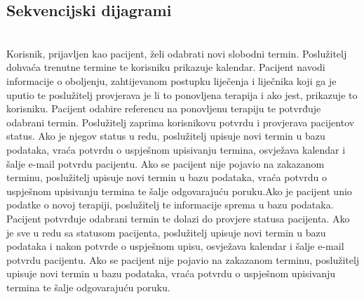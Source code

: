 \newpage
\subsection{Sekvencijski dijagrami}

\textbf{}\\

Korisnik, prijavljen kao pacijent, želi odabrati novi slobodni termin. Poslužitelj dohvaća trenutne termine te korisniku prikazuje kalendar. Pacijent navodi informacije o oboljenju, zahtijevanom postupku liječenja i liječnika koji ga je uputio te poslužitelj provjerava je li to ponovljena terapija i ako jest, prikazuje to korisniku. Pacijent odabire referencu na ponovljenu terapiju te potvrđuje odabrani termin. Poslužitelj zaprima korisnikovu potvrdu i provjerava pacijentov status. Ako je njegov status u redu, poslužitelj upisuje novi termin u bazu podataka, vraća potvrdu o uspješnom upisivanju termina, osvježava kalendar i šalje e-mail potvrdu pacijentu. Ako se pacijent nije pojavio na zakazanom terminu, poslužitelj upisuje novi termin u bazu podataka, vraća potvrdu o uspješnom upisivanju termina te šalje odgovarajuću poruku.\newline Ako je pacijent unio podatke o novoj terapiji, poslužitelj te informacije sprema u bazu podataka. Pacijent potvrđuje odabrani termin te dolazi do provjere statusa pacijenta. Ako je sve u redu sa statusom pacijenta, poslužitelj upisuje novi termin u bazu podataka i nakon potvrde o uspješnom upisu, osvježava kalendar i šalje e-mail potvrdu pacijentu. Ako se pacijent nije pojavio na zakazanom terminu, poslužitelj upisuje novi termin u bazu podataka, vraća potvrdu o uspješnom upisivanju termina te šalje odgovarajuću poruku.


